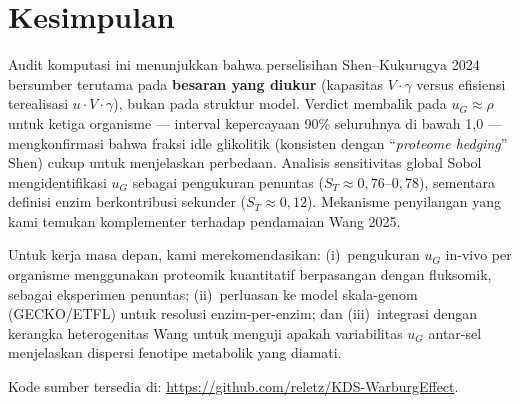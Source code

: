 \section{Kesimpulan}

Audit komputasi ini menunjukkan bahwa perselisihan Shen--Kukurugya 2024
bersumber terutama pada \textbf{besaran yang diukur} (kapasitas $V\!\cdot\!\gamma$
versus efisiensi terealisasi $u\!\cdot\!V\!\cdot\!\gamma$), bukan pada
struktur model. Verdict membalik pada $u_G \approx \rho$ untuk ketiga
organisme --- interval kepercayaan 90\% seluruhnya di bawah 1{,}0 ---
mengkonfirmasi bahwa fraksi idle glikolitik (konsisten dengan ``\textit{proteome
hedging}'' Shen) cukup untuk menjelaskan perbedaan. Analisis sensitivitas
global Sobol mengidentifikasi $u_G$ sebagai pengukuran penuntas
($S_T \approx 0{,}76$--$0{,}78$), sementara definisi enzim berkontribusi
sekunder ($S_T \approx 0{,}12$). Mekanisme penyilangan yang kami temukan
komplementer terhadap pendamaian Wang 2025.

Untuk kerja masa depan, kami merekomendasikan: (i)~pengukuran $u_G$
in-vivo per organisme menggunakan proteomik kuantitatif berpasangan
dengan fluksomik, sebagai eksperimen penuntas; (ii)~perluasan ke model
skala-genom (GECKO/ETFL) untuk resolusi enzim-per-enzim; dan
(iii)~integrasi dengan kerangka heterogenitas Wang untuk menguji apakah
variabilitas $u_G$ antar-sel menjelaskan dispersi fenotipe metabolik
yang diamati.

Kode sumber tersedia di: \url{https://github.com/reletz/KDS-WarburgEffect}.
